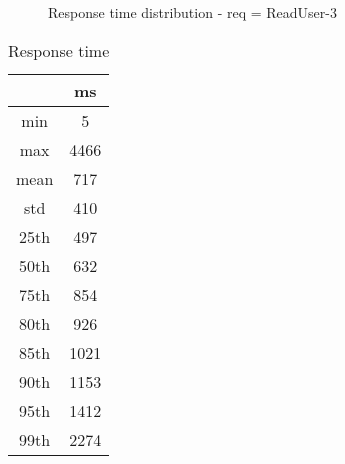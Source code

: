 \begin{minipage}{0.75\linewidth}
\begin{figure}[h]
\begin{adjustbox}{max width=1.0\linewidth, keepaspectratio}
  \end{adjustbox}
  \caption{Response time distribution - req = ReadUser-3}
\end{figure}
\end{minipage}\hfill\begin{minipage}{0.18\linewidth}
\begin{table}[h]
\begin{tabular}{|cc|}
\hline
\textbf{} & \textbf{ms}\\ \hline
 \Xhline{0.005\arrayrulewidth}
min & 5\\
 \Xhline{0.005\arrayrulewidth}
max & 4466\\
 \Xhline{0.005\arrayrulewidth}
mean & 717\\
 \Xhline{0.005\arrayrulewidth}
std & 410\\
\hline
\hline
 \Xhline{0.005\arrayrulewidth}
25th & 497\\
 \Xhline{0.005\arrayrulewidth}
50th & 632\\
 \Xhline{0.005\arrayrulewidth}
75th & 854\\
 \Xhline{0.005\arrayrulewidth}
80th & 926\\
 \Xhline{0.005\arrayrulewidth}
85th & 1021\\
 \Xhline{0.005\arrayrulewidth}
90th & 1153\\
 \Xhline{0.005\arrayrulewidth}
95th & 1412\\
 \Xhline{0.005\arrayrulewidth}
99th & 2274\\
\hline
\end{tabular}
\caption{Response time}
\end{table}
\end{minipage}\hfill